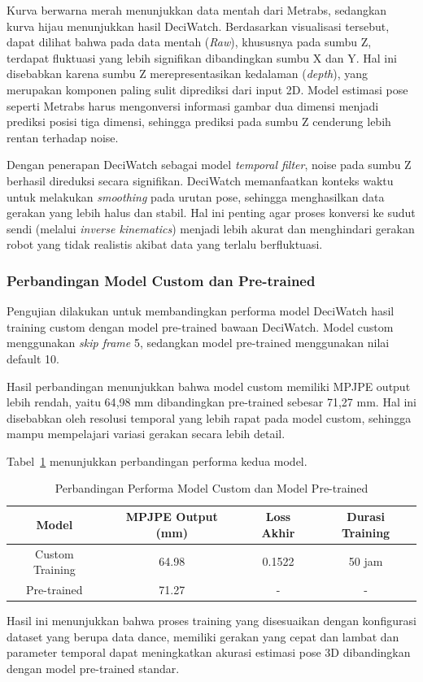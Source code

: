 Kurva berwarna merah menunjukkan data mentah dari Metrabs, sedangkan kurva hijau menunjukkan hasil DeciWatch. Berdasarkan visualisasi tersebut, dapat dilihat bahwa pada data mentah (\textit{Raw}), khususnya pada sumbu Z, terdapat fluktuasi yang lebih signifikan dibandingkan sumbu X dan Y. Hal ini disebabkan karena sumbu Z merepresentasikan kedalaman (\textit{depth}), yang merupakan komponen paling sulit diprediksi dari input 2D. Model estimasi pose seperti Metrabs harus mengonversi informasi gambar dua dimensi menjadi prediksi posisi tiga dimensi, sehingga prediksi pada sumbu Z cenderung lebih rentan terhadap noise.

Dengan penerapan DeciWatch sebagai model \textit{temporal filter}, noise pada sumbu Z berhasil direduksi secara signifikan. DeciWatch memanfaatkan konteks waktu untuk melakukan \textit{smoothing} pada urutan pose, sehingga menghasilkan data gerakan yang lebih halus dan stabil. Hal ini penting agar proses konversi ke sudut sendi (melalui \textit{inverse kinematics}) menjadi lebih akurat dan menghindari gerakan robot yang tidak realistis akibat data yang terlalu berfluktuasi.


\subsubsection{Perbandingan Model Custom dan Pre-trained}

Pengujian dilakukan untuk membandingkan performa model DeciWatch hasil training custom dengan model pre-trained bawaan DeciWatch. Model custom menggunakan \textit{skip frame} 5, sedangkan model pre-trained menggunakan nilai default 10.

Hasil perbandingan menunjukkan bahwa model custom memiliki MPJPE output lebih rendah, yaitu 64{,}98 mm dibandingkan pre-trained sebesar 71{,}27 mm. Hal ini disebabkan oleh resolusi temporal yang lebih rapat pada model custom, sehingga mampu mempelajari variasi gerakan secara lebih detail.

Tabel~\ref{tab:perbandingan_model} menunjukkan perbandingan performa kedua model.

\begin{table}[H]
\centering
\caption{Perbandingan Performa Model Custom dan Model Pre-trained}
\label{tab:perbandingan_model}
\begin{tabular}{|c|c|c|c|}
\hline
\textbf{Model} & \textbf{MPJPE Output (mm)} & \textbf{Loss Akhir} & \textbf{Durasi Training} \\ \hline
Custom Training & 64.98 & 0.1522 & 50 jam \\ \hline
Pre-trained & 71.27 & - & - \\ \hline
\end{tabular}
\end{table}

Hasil ini menunjukkan bahwa proses training yang disesuaikan dengan konfigurasi dataset yang berupa data dance, memiliki gerakan yang cepat dan lambat dan parameter temporal dapat meningkatkan akurasi estimasi pose 3D dibandingkan dengan model pre-trained standar.

